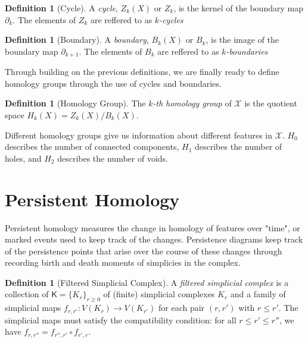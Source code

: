 \documentclass[ma]{uncgdissertationexp}
\theoremstyle{plain}
\theoremstyle{definition}
\newtheorem{definition}[theorem]{Definition}
\theoremstyle{remark}
\begin{document}
\begin{definition}[Cycle]
A \textit{cycle}, $Z_{k}(X)$ or $Z_k$, is the kernel of the boundary map $\partial_{k}$. The elements of $Z_k$ are reffered to as $k$\textit{-cycles}
\end{definition}

\begin{definition}[Boundary]
A \textit{boundary}, $B_{k}(X)$ or $B_k$, is the image of the boundary map $\partial_{k+1}$. The elements of $B_k$ are reffered to as $k$\textit{-boundaries}
\end{definition}

Through building on the previous definitions, we are finally ready to define homology groups through the use of cycles and boundaries.

\begin{definition}[Homology Group]
The $k$\textit{-th} \textit{homology group} of $\mathcal{X}$ is the quotient space $H_k(X) = Z_{k}(X)/B_{k}(X)$.
\end{definition}

\par Different homology groups give us information about different features in $\mathcal{X}$. $H_{0}$ describes the number of connected components, $H_{1}$ describes the number of holes, and $H_{2}$ describes the number of voids.

\section{Persistent Homology}

\par Persistent homology measures the change in homology of features over "time", or marked events used to keep track of the changes. Persistence diagrams keep track of the persistence points that arise over the course of these changes through recording birth and death moments of simplicies in the complex.

\begin{definition}[Filtered Simplicial Complex]
A \textit{filtered simplicial complex} is a collection of $\mathsf{K}=\{K_{r}\}_{r\geq 0}$ of (finite) simplicial complexes $K_{r}$ and a family of simplicial maps $f_{r, r'}: V(K_{r})\rightarrow V(K_{r'})$ for each pair $(r, r')$ with $r \leq r'$. The simplicial maps must satisfy the compatibility condition: for all $r\leq r'\leq r''$, we have $f_{r, r''} = f_{r'', r'} \circ {f_{r', r}}$.
\end{definition}
\end{document}
